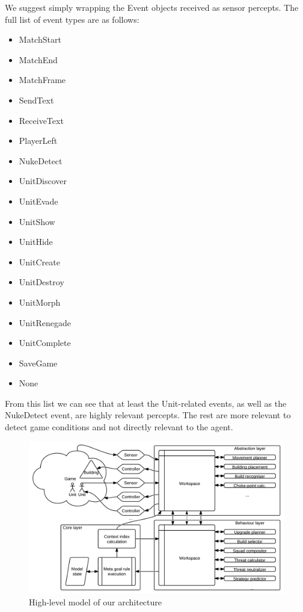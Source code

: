 We suggest simply wrapping the Event objects received as sensor percepts. The
full list of event types are as follows:
\begin{multicols}{2}
\begin{itemize}
    \item MatchStart
    \item MatchEnd
    \item MatchFrame
    \item SendText
    \item ReceiveText
    \item PlayerLeft
    \item NukeDetect
    \item UnitDiscover
    \item UnitEvade
    \item UnitShow
    \item UnitHide
    \item UnitCreate
    \item UnitDestroy
    \item UnitMorph
    \item UnitRenegade
    \item UnitComplete
    \item SaveGame
    \item None 
\end{itemize}
\end{multicols}
From this list we can see that at least the Unit-related events, as well as the
NukeDetect event, are highly relevant percepts. The rest are more relevant to
detect game conditions and not directly relevant to the agent.

\begin{figure}[h!tb]
\centering
\includegraphics[scale=0.8]{graphics/our-architecture.png}
\caption{High-level model of our architecture}
\label{fig:our-architecture}
\end{figure}


